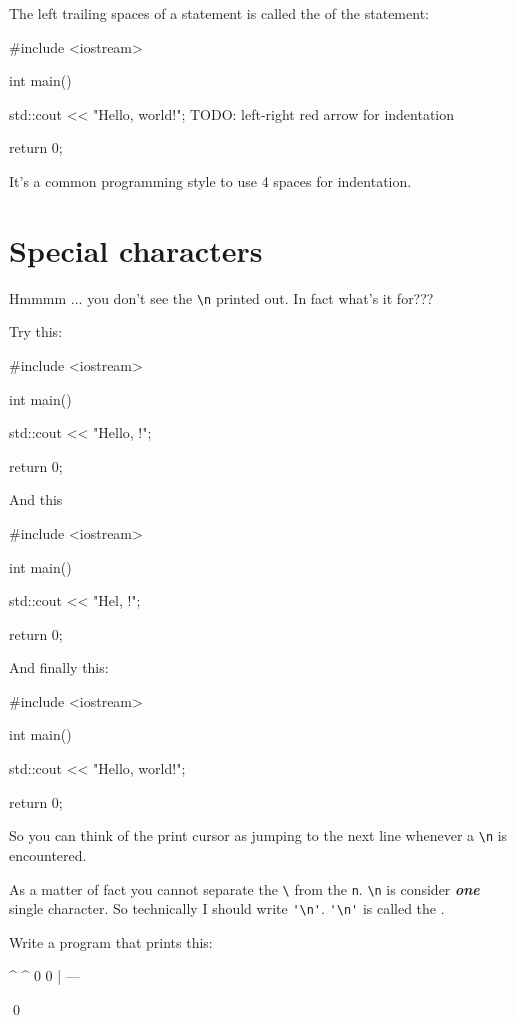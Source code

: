 The left trailing spaces of a statement is called the 
of the statement:
\begin{console}
#include <iostream>

int main()
{
    std::cout << "Hello, world!\n";
    TODO: left-right red arrow for indentation
 
    return 0;
}
\end{console}
It's a common programming style to use 4 spaces for indentation. 








\newpage\section{Special characters}


Hmmmm ... you don't see the \verb!\n! printed out. In fact what's it for???

Try this:
\begin{console}
#include <iostream>

int main()
{
    std::cout << "Hello, \nworld!\n";

    return 0;
}
\end{console}
And this
\begin{console}
#include <iostream>

int main()
{
    std::cout << "Hel\nlo, \nworld!\n";

    return 0;
}
\end{console}
And finally this:
\begin{console}
#include <iostream>

int main()
{
    std::cout << "Hello, world!";

    return 0;
}
\end{console} 
So you can think of the print cursor as jumping to the next line whenever a 
\verb!\n! is encountered. 

As a matter of fact you cannot separate the 
\verb!\! from the \verb!n!. 
\verb!\n! is consider \textit{\textbf{one}} single character. 
So technically I should write \verb!'\n'!. 
\verb!'\n'! is called the 
.




\begin{ex} 
Write a program that prints this:
\begin{console}
^ ^
0 0
 |
---
\end{console}
\qed
\end{ex}



